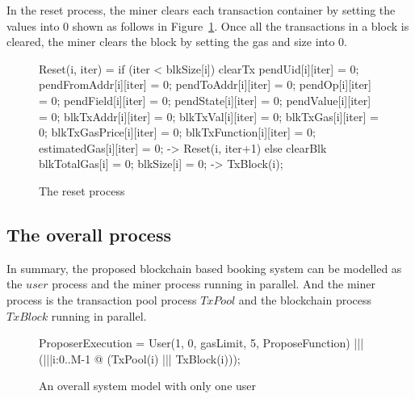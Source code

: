 \documentclass{KERauth}
\begin{document}
In the reset process, the miner clears each transaction container by setting the values into $0$ shown as follows in Figure~\ref{fig:reset}. Once all the transactions in a block is cleared, the miner clears the block by setting the gas and size into $0$.

\begin{figure}[!h]
\begin{center}
\begin{boxedverbatim}
Reset(i, iter) = 
  if (iter < blkSize[i]) {clearTx{
                                 pendUid[i][iter] = 0;
                                 pendFromAddr[i][iter] = 0; 
                                 pendToAddr[i][iter] = 0;
                                 pendOp[i][iter] = 0;
                                 pendField[i][iter] = 0;
                                 pendState[i][iter] = 0;
                                 pendValue[i][iter] = 0;
                                 blkTxAddr[i][iter] = 0;
                                 blkTxVal[i][iter] = 0;
                                 blkTxGas[i][iter] = 0;
                                 blkTxGasPrice[i][iter] = 0;
                                 blkTxFunction[i][iter] = 0;
                                 estimatedGas[i][iter] = 0;} ->
                         Reset(i, iter+1)} 
  else {clearBlk{
                 blkTotalGas[i] = 0;
                 blkSize[i] = 0;} ->
        TxBlock(i)};
\end{boxedverbatim}
\end{center}
\caption{The reset process}\label{fig:reset}
\end{figure}

\subsection{The overall process}

In summary, the proposed blockchain based booking system can be modelled as the $user$ process and the miner process running in parallel. And the miner process is the transaction pool process $TxPool$ and the blockchain process $TxBlock$ running in parallel. 

\begin{figure}[h]
\begin{center}
\begin{boxedverbatim}
ProposerExecution = User(1, 0, gasLimit, 5, ProposeFunction) ||| 
                    (|||i:{0..M-1} @ (TxPool(i) ||| TxBlock(i)));
\end{boxedverbatim}
\end{center}
\caption{An overall system model with only one user}
\end{figure}
\end{document}
